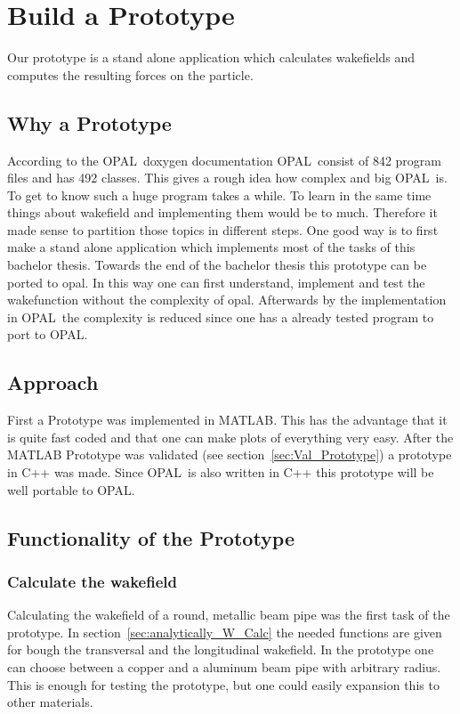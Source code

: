 \documentclass[11pt,a4paper]{article}
\newcommand{\opal}{\textsc{OPAL}}
\begin{document}
\section{Build a Prototype}
Our prototype is a stand alone application which calculates wakefields and computes the resulting forces on the particle. 

\subsection{Why a Prototype}
According to the \opal\ doxygen documentation \opal\ consist of 842 program files and has 492 classes. This gives a rough idea how complex and big \opal\ is. To get to know such a huge program takes a while. To learn in the same time things about wakefield and implementing them would be to much. Therefore it made sense to partition those topics in different steps. One good way is to first make a stand alone application which implements most of the tasks of this bachelor thesis. Towards the end of the bachelor thesis this prototype can be ported to opal. In this way one can first understand, implement and test the wakefunction without the complexity of opal. Afterwards by the implementation in \opal\ the complexity is reduced since one has a already tested program to port to \opal.

\subsection{Approach}
First a Prototype was implemented in MATLAB. This has the advantage that it is quite fast coded and that one can make plots of everything very easy. After the MATLAB Prototype was validated (see section~\ref{sec:Val_Prototype}) a prototype in C++ was made. Since \opal\ is also written in C++ this prototype will be well portable to \opal.

\subsection{Functionality of the Prototype}
\subsubsection{Calculate the wakefield}
Calculating the wakefield of a round, metallic beam pipe was the first task of the prototype. In section~\ref{sec:analytically_W_Calc} the needed functions are given for bough the transversal and the longitudinal wakefield. In the prototype one can choose between a copper and a aluminum beam pipe with arbitrary radius. This is enough for testing the prototype, but one could easily expansion this to other materials.
\end{document}
